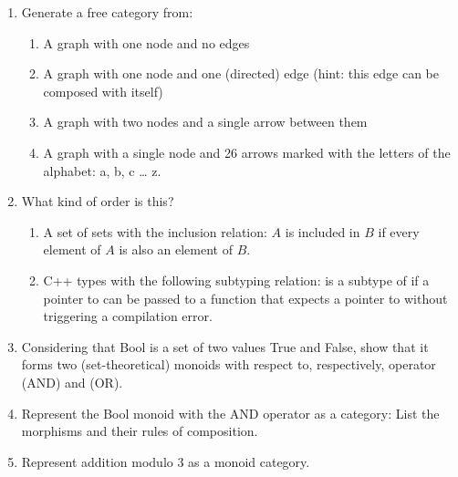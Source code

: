 \begin{enumerate}
\tightlist
\item
  Generate a free category from:

  \begin{enumerate}
  \tightlist
  \item
    A graph with one node and no edges
  \item
    A graph with one node and one (directed) edge (hint: this edge can
    be composed with itself)
  \item
    A graph with two nodes and a single arrow between them
  \item
    A graph with a single node and 26 arrows marked with the letters of
    the alphabet: a, b, c \ldots{} z.
  \end{enumerate}
\item
  What kind of order is this?

  \begin{enumerate}
  \tightlist
  \item
    A set of sets with the inclusion relation: $A$ is included in $B$ if
    every element of $A$ is also an element of $B$.
  \item
    C++ types with the following subtyping relation:  is a subtype of
     if a pointer to  can be passed to a function that expects a
    pointer to  without triggering a compilation error.
  \end{enumerate}
\item
  Considering that Bool is a set of two values True and False, show that
  it forms two (set-theoretical) monoids with respect to, respectively,
  operator \code{\&\&} (AND) and \code{||} (OR).
\item
  Represent the Bool monoid with the AND operator as a category: List
  the morphisms and their rules of composition.
\item
  Represent addition modulo 3 as a monoid category.
\end{enumerate}
